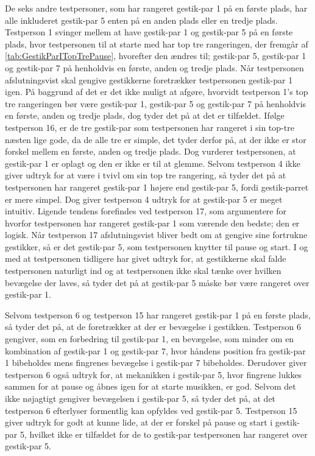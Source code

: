 De seks andre testpersoner, som har rangeret gestik-par 1 på en første plads, har alle inkluderet gestik-par 5 enten på en anden plads eller en tredje plads. Testperson 1 svinger mellem at have gestik-par 1 og gestik-par 5 på en første plads, hvor testpersonen til at starte med har top tre rangeringen, der fremgår af \autoref{tab:GestikParITopTrePause}, hvorefter den ændres til; gestik-par 5, gestik-par 1 og gestik-par 7 på henholdvis en første, anden og tredje plads. Når testpersonen afslutningsvist skal gengive gestikkerne foretrækker testpersonen gestik-par 1 igen. På baggrund af det er det ikke muligt at afgøre, hvorvidt testperson 1's top tre rangeringen bør være gestik-par 1, gestik-par 5 og gestik-par 7 på henholdvis en første, anden og tredje plads, dog tyder det på at det er tilfældet. Ifølge testperson 16, er de tre gestik-par som testpersonen har rangeret i sin top-tre næsten lige gode, da de alle tre er simple, det tyder derfor på, at der ikke er stor forskel mellem en første, anden og tredje plads. Dog vurderer testpersonen, at gestik-par 1 er oplagt og den er ikke er til at glemme. Selvom testperson 4 ikke giver udtryk for at være i tvivl om sin top tre rangering, så tyder det på at testpersonen har rangeret gestik-par 1 højere end gestik-par 5, fordi gestik-parret er mere simpel. Dog giver testperson 4 udtryk for at gestik-par 5 er meget intuitiv. Ligende tendens forefindes ved testperson 17, som argumentere for hvorfor testpersonen har rangeret gestik-par 1 som værende den bedste; den er logisk. Når testperson 17 afslutningsvist bliver bedt om at gengive sine fortrukne gestikker, så er det gestik-par 5, som testpersonen knytter til pause og start. I og med at testpersonen tidligere har givet udtryk for, at gestikkerne skal falde testpersonen naturligt ind og at testpersonen ikke skal tænke over hvilken bevægelse der laves, så tyder det på at gestik-par 5 måske bør være rangeret over gestik-par 1.   

Selvom testperson 6 og testperson 15 har rangeret gestik-par 1 på en første plads, så tyder det på, at de foretrækker at der er bevægelse i gestikken. Testperson 6 gengiver, som en forbedring til gestik-par 1, en bevægelse, som minder om en kombination af gestik-par 1 og gestik-par 7, hvor håndens position fra gestik-par 1 bibeholdes mens fingrenes bevægelse i gestik-par 7 bibeholdes. Derudover giver testperson 6 også udtryk for, at mekanikken i gestik-par 5, hvor fingrene lukkes sammen for at pause og åbnes igen for at starte musikken, er god. Selvom det ikke nøjagtigt gengiver bevægelsen i gestik-par 5, så tyder det på, at det testperson 6 efterlyser formentlig kan opfyldes ved gestik-par 5. Testperson 15 giver udtryk for godt at kunne lide, at der er forskel på pause og start i gestik-par 5, hvilket ikke er tilfældet for de to gestik-par testpersonen har rangeret over gestik-par 5. 
%
